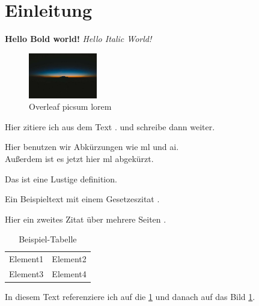 \documentclass[../main.tex]{subfiles}
\begin{document}
\section{Einleitung}

\textbf{Hello Bold world!} %
\textit{Hello Italic World!} %

\begin{figure}[h]
    \centering
    \includegraphics[width=3cm]{images/picsum lorem.jpg} %
    \caption{Overleaf picsum lorem} %
    \label{fig:picsum_lorem} %
\end{figure}

Hier zitiere ich aus dem Text \autocite[10]{smith2018}. und schreibe dann weiter.\par %


Hier benutzen wir Abkürzungen wie \gls{ml} und \gls{ai}.\\ %
Außerdem ist es jetzt hier \gls{ml} abgekürzt.\par %


\begin{definition}
Das ist eine Lustige definition.
\end{definition}

Ein Beispieltext mit einem Gesetzeszitat . %

Hier ein zweites Zitat über mehrere Seiten \autocite[15-27]{johnson2020}. %

\medskip

\begin{table}[h]
    \centering
    \begin{tabular}{cc}
        Element1 & Element2\\
        Element3 & Element4\\
    \end{tabular}
    \caption{Beispiel-Tabelle} %
    \label{tab:example_table} %
\end{table}

In diesem Text referenziere ich auf die  \cref{tab:example_table} und danach auf das Bild \cref{fig:picsum_lorem}.
\end{document}
